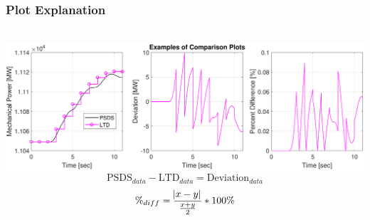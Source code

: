 \documentclass[14pt, unknownkeysallowed]{beamer}
\begin{document}
\begin{frame}
\frametitle{Plot Explanation}\ \\
\vspace{.25em}
		\includegraphics[width=\linewidth]{comparisonsEx} 
		{\footnotesize
		\[\text{PSDS}_{data}-\text{LTD}_{data} = \text{Deviation}_{data}\]
		\[\%_{diff} = \dfrac{\abs{x-y}}{\frac{x+y}{2}}*100\% \]}
\end{frame}
\end{document}
